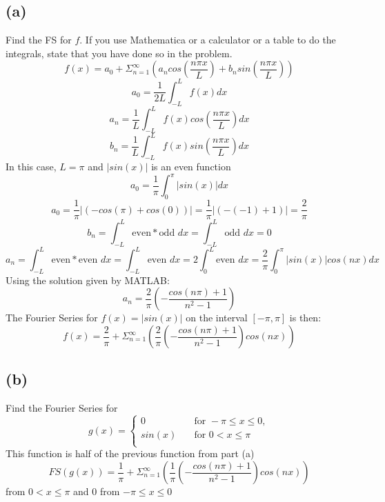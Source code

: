 \documentclass[preview,12pt]{article}
\begin{document}
    \subsection*{(a)}
        Find the FS for $f$.  If you use Mathematica or a calculator or a table to do the integrals, state that you have done so in the problem.  
        $$f(x)=a_0+\Sigma_{n=1}^\infty\left(a_ncos(\frac{n\pi x}{L})+b_nsin(\frac{n \pi x}{L})\right)$$
        $$a_0=\frac{1}{2L}\int_{-L}^Lf(x)dx$$
        $$a_n=\frac{1}{L}\int_{-L}^Lf(x)cos(\frac{n \pi x}{L})dx$$
        $$b_n=\frac{1}{L}\int_{-L}^Lf(x)sin(\frac{n \pi x}{L})dx$$
        In this case, $L=\pi$ and $|sin(x)|$ is an even function
        $$a_0=\frac{1}{\pi}\int_{0}^\pi |sin(x)| dx$$
        $$a_0=\frac{1}{\pi}|(-cos(\pi)+cos(0))|=\frac{1}{\pi}|(-(-1)+1)|=\frac{2}{\pi}$$
        $$b_n=\int_{-L}^L\textrm{even}*\textrm{odd }dx=\int_{-L}^L\textrm{odd }dx=0$$
        $$a_n=\int_{-L}^L\textrm{even}*\textrm{even }dx=\int_{-L}^L\textrm{even }dx=2\int_{0}^L\textrm{even }dx=\frac{2}{\pi}\int_{0}^\pi |sin(x)|cos(nx)dx$$
        Using the solution given by MATLAB:
        $$a_n=\frac{2}{\pi}\left(-\frac{cos(n\pi)+1}{n^2-1}\right)$$
        The Fourier Series for $f(x)=|sin(x)|$ on the interval $[-\pi,\pi]$ is then:
        $$f(x)=\frac{2}{\pi}+\Sigma_{n=1}^\infty \left(\frac{2}{\pi}\left(-\frac{cos(n\pi)+1}{n^2-1}\right)cos(nx)\right)$$
    \subsection*{(b)}
        Find the Fourier Series for
        \[   
        g(x) = 
        \begin{cases}
         0 &\quad\text{for } -\pi \leq x \leq 0, \\
         sin(x) &\quad\text{for } 0<x\leq\pi \\
        \end{cases}
        \]
        This function is half of the previous function from part (a)
        $$FS(g(x))=\frac{1}{\pi}+\Sigma_{n=1}^\infty \left(\frac{1}{\pi}\left(-\frac{cos(n\pi)+1}{n^2-1}\right)cos(nx)\right)$$
        from $0<x\leq\pi$ and 0 from $-\pi\leq x \leq 0$
        
\end{document}
